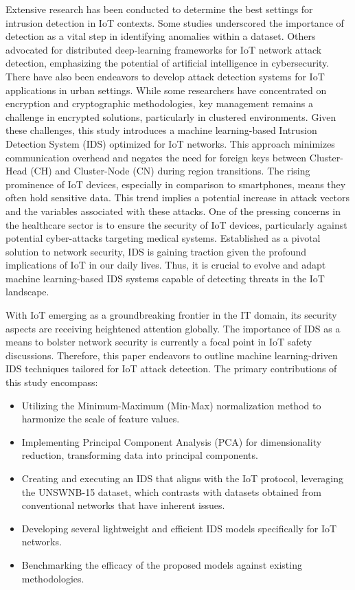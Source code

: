 Extensive research has been conducted to determine the best settings for intrusion detection in IoT contexts. Some studies underscored the importance of detection as a vital step in identifying anomalies within a dataset. Others advocated for distributed deep-learning frameworks for IoT network attack detection, emphasizing the potential of artificial intelligence in cybersecurity. There have also been endeavors to develop attack detection systems for IoT applications in urban settings. While some researchers have concentrated on encryption and cryptographic methodologies, key management remains a challenge in encrypted solutions, particularly in clustered environments. Given these challenges, this study introduces a machine learning-based Intrusion Detection System (IDS) optimized for IoT networks. This approach minimizes communication overhead and negates the need for foreign keys between Cluster-Head (CH) and Cluster-Node (CN) during region transitions. The rising prominence of IoT devices, especially in comparison to smartphones, means they often hold sensitive data. This trend implies a potential increase in attack vectors and the variables associated with these attacks. One of the pressing concerns in the healthcare sector is to ensure the security of IoT devices, particularly against potential cyber-attacks targeting medical systems. Established as a pivotal solution to network security, IDS is gaining traction given the profound implications of IoT in our daily lives. Thus, it is crucial to evolve and adapt machine learning-based IDS systems capable of detecting threats in the IoT landscape.

With IoT emerging as a groundbreaking frontier in the IT domain, its security aspects are receiving heightened attention globally. The importance of IDS as a means to bolster network security is currently a focal point in IoT safety discussions. Therefore, this paper endeavors to outline machine learning-driven IDS techniques tailored for IoT attack detection. The primary contributions of this study encompass:

\begin{itemize}
    \item Utilizing the Minimum-Maximum (Min-Max) normalization method to harmonize the scale of feature values.
    \item Implementing Principal Component Analysis (PCA) for dimensionality reduction, transforming data into principal components.
    \item Creating and executing an IDS that aligns with the IoT protocol, leveraging the UNSWNB-15 dataset, which contrasts with datasets obtained from conventional networks that have inherent issues.
    \item Developing several lightweight and efficient IDS models specifically for IoT networks.
    \item Benchmarking the efficacy of the proposed models against existing methodologies.
\end{itemize}
